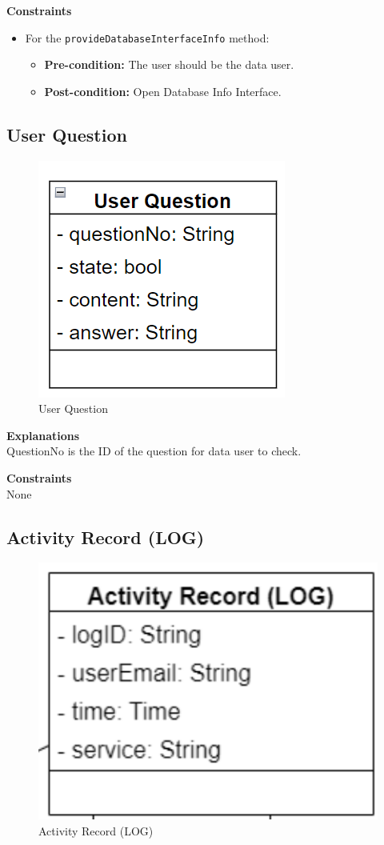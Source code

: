 \textbf{Constraints}
\begin{itemize}
    \item For the \texttt{provideDatabaseInterfaceInfo} method:
    \begin{itemize}
        \item \textbf{Pre-condition:} The user should be the data user.
        \item \textbf{Post-condition:} Open Database Info Interface.
    \end{itemize}
\end{itemize}

\subsection{User Question}

\begin{figure}[H]
    \centering
    \includegraphics[width=0.3\linewidth]{picture/3-6/3-6-2.jpg}
    \caption{User Question}
    \label{fig:enter-label}
\end{figure}

\textbf{Explanations} \\
QuestionNo is the ID of the question for data user to check.

\textbf{Constraints} \\
None

\subsection{Activity Record (LOG)}

\begin{figure}[H]
    \centering
    \includegraphics[width=0.3\linewidth]{picture/3-6/3-6-3.jpg}
    \caption{Activity Record (LOG)}
    \label{fig:enter-label}
\end{figure}

